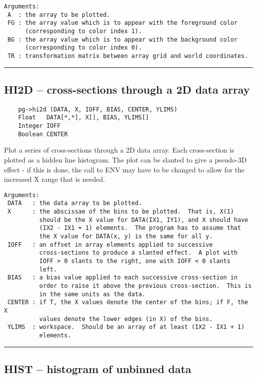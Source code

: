 \begin{verbatim}
Arguments:
 A  : the array to be plotted.
 FG : the array value which is to appear with the foreground color
      (corresponding to color index 1). 
 BG : the array value which is to appear with the background color
      (corresponding to color index 0). 
 TR : transformation matrix between array grid and world coordinates.
\end{verbatim}

\hrule

\subsection*{HI2D -- cross-sections through a 2D data array }

\begin{verbatim}
    pg->hi2d (DATA, X, IOFF, BIAS, CENTER, YLIMS)
    Float   DATA[*,*], X[], BIAS, YLIMS[]
    Integer IOFF
    Boolean CENTER
\end{verbatim}

Plot a series of cross-sections through a 2D data array.  Each
cross-section is plotted as a hidden line histogram.  The plot can be
slanted to give a pseudo-3D effect - if this is done, the call to ENV
may have to be changed to allow for the increased X range that is
needed.

\begin{verbatim}
Arguments:
 DATA   : the data array to be plotted.
 X      : the abscissae of the bins to be plotted.  That is, X(1)
          should be the X value for DATA(IX1, IY1), and X should have 
          (IX2 - IX1 + 1) elements.  The program has to assume that
          the X value for DATA(x, y) is the same for all y.
 IOFF   : an offset in array elements applied to successive
          cross-sections to produce a slanted effect.  A plot with
          IOFF > 0 slants to the right, one with IOFF < 0 slants
          left. 
 BIAS   : a bias value applied to each successive cross-section in
          order to raise it above the previous cross-section.  This is
          in the same units as the data.
 CENTER : if T, the X values denote the center of the bins; if F, the X
          values denote the lower edges (in X) of the bins. 
 YLIMS  : workspace.  Should be an array of at least (IX2 - IX1 + 1)
          elements. 
\end{verbatim}

\hrule

\subsection*{HIST -- histogram of unbinned data }

